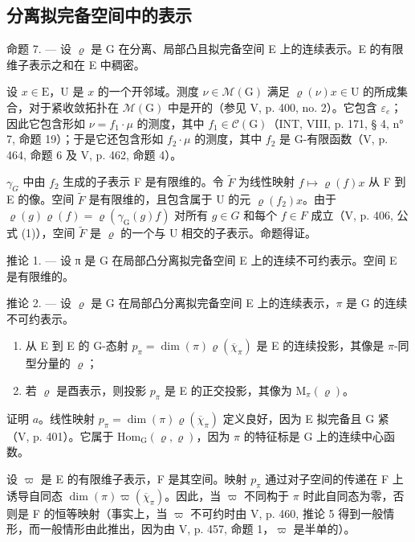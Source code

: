 \subsection{分离拟完备空间中的表示}

命题 7. --- 设 \(\varrho\) 是 G 在分离、局部凸且拟完备空间 E 上的连续表示。E 的有限维子表示之和在 E 中稠密。

设 \(x \in \mathrm{E}\)，U 是 \(x\) 的一个开邻域。测度 \(\nu \in \mathcal{M}(\mathrm{G})\) 满足 \(\varrho(\nu)x \in \mathrm{U}\) 的所成集合，对于紧收敛拓扑在 \(\mathcal{M}(\mathrm{G})\) 中是开的（参见 V, p. 400, no. 2）。它包含 \(\varepsilon_e\)；因此它包含形如 \(\nu = f_1 \cdot \mu\) 的测度，其中 \(f_1 \in \mathcal{C}(\mathrm{G})\)（INT, VIII, p. 171, § 4, n° 7, 命题 19）；于是它还包含形如 \(f_2 \cdot \mu\) 的测度，其中 \(f_2\) 是 G-有限函数（V, p. 464, 命题 6 及 V, p. 462, 命题 4）。

\(\gamma_{G}\) 中由 \(f_{2}\) 生成的子表示 F 是有限维的。令 \(\widetilde{F}\) 为线性映射 \(f \mapsto \varrho(f)x\) 从 F 到 E 的像。空间 \(\widetilde{F}\) 是有限维的，且包含属于 U 的元 \(\varrho(f_{2})x\)。由于 \(\varrho(g)\varrho(f) = \varrho(\gamma_{\mathrm{G}}(g)f)\) 对所有 \(g \in G\) 和每个 \(f \in F\) 成立（V, p. 406, 公式 (1)），空间 \(\widetilde{F}\) 是 \(\varrho\) 的一个与 U 相交的子表示。命题得证。

推论 1. --- 设 π 是 G 在局部凸分离拟完备空间 E 上的连续不可约表示。空间 E 是有限维的。

推论 2. --- 设 \(\varrho\) 是 G 在局部凸分离拟完备空间 E 上的连续表示，\(\pi\) 是 G 的连续不可约表示。

\begin{enumerate}
\def\labelenumi{\alph{enumi})}
\item
  从 E 到 E 的 G-态射 \(p_{\pi} = \dim(\pi)\varrho(\overline{\chi}_{\pi})\) 是 E 的连续投影，其像是 \(\pi\)-同型分量的 \(\varrho\)；
\item
  若 \(\varrho\) 是酉表示，则投影 \(p_{\pi}\) 是 E 的正交投影，其像为 \(\mathrm{M}_{\pi}(\varrho)\)。
\end{enumerate}

证明 \(a\)。线性映射 \(p_{\pi} = \dim(\pi)\varrho(\overline{\chi}_{\pi})\) 定义良好，因为 E 拟完备且 G 紧（V, p. 401）。它属于 \(\mathrm{Hom}_{\mathrm{G}}(\varrho,\varrho)\)，因为 \(\pi\) 的特征标是 G 上的连续中心函数。

设 \(\varpi\) 是 E 的有限维子表示，F 是其空间。映射 \(p_{\pi}\) 通过对子空间的传递在 F 上诱导自同态 \(\dim(\pi)\varpi(\overline{\chi}_{\pi})\)。因此，当 \(\varpi\) 不同构于 \(\pi\) 时此自同态为零，否则是 F 的恒等映射（事实上，当 \(\varpi\) 不可约时由 V, p. 460, 推论 5 得到一般情形，而一般情形由此推出，因为由 V, p. 457, 命题 1，\(\varpi\) 是半单的）。

